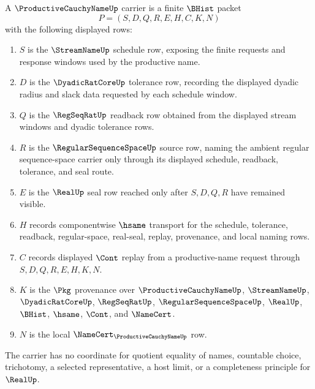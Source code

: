 \begin{definition}
\label{def:productive-cauchy-name-carrier}
A $\ProductiveCauchyNameUp$ carrier is a finite $\BHist$ packet
$$
P=(S,D,Q,R,E,H,C,K,N)
$$
with the following displayed rows:
\begin{enumerate}
\item $S$ is the $\StreamNameUp$ schedule row, exposing the finite requests and response windows used by the productive name.
\item $D$ is the $\DyadicRatCoreUp$ tolerance row, recording the displayed dyadic radius and slack data requested by each schedule window.
\item $Q$ is the $\RegSeqRatUp$ readback row obtained from the displayed stream windows and dyadic tolerance rows.
\item $R$ is the $\RegularSequenceSpaceUp$ source row, naming the ambient regular sequence-space carrier only through its displayed schedule, readback, tolerance, and seal route.
\item $E$ is the $\RealUp$ seal row reached only after $S,D,Q,R$ have remained visible.
\item $H$ records componentwise $\hsame$ transport for the schedule, tolerance, readback, regular-space, real-seal, replay, provenance, and local naming rows.
\item $C$ records displayed $\Cont$ replay from a productive-name request through $S,D,Q,R,E,H,K,N$.
\item $K$ is the $\Pkg$ provenance over $\ProductiveCauchyNameUp$, $\StreamNameUp$, $\DyadicRatCoreUp$, $\RegSeqRatUp$, $\RegularSequenceSpaceUp$, $\RealUp$, $\BHist$, $\hsame$, $\Cont$, and $\NameCert$.
\item $N$ is the local $\NameCert_{\ProductiveCauchyNameUp}$ row.
\end{enumerate}
The carrier has no coordinate for quotient equality of names, countable choice, trichotomy, a selected representative, a host limit, or a completeness principle for $\RealUp$.
\end{definition}


